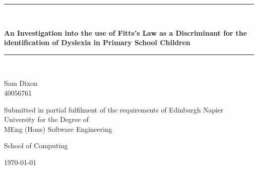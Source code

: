 \newcommand{\HRule}{\rule{\linewidth}{0.5mm}}

\begin{titlepage}
	\begin{center}

		\HRule \\[0.4cm]
	   	
	   	{\Large \bfseries An Investigation into the use of Fitts's Law as a Discriminant for the identification of Dyslexia in Primary School Children\par}
		\vspace{0.2cm}
		
		\HRule \\[1.5cm]
		
	   	\vspace{3cm}
		
		\begin{minipage}{0.4\textwidth}
			\begin{center}
				\large
				Sam Dixon 
				\\ 40056761		
		   	\end{center}
	    \end{minipage}
		
		\vspace{2cm}
		
	   	\begin{minipage}{1\textwidth}
	    	\begin{center} \large
				Submitted in partial fulfilment of the requirements of Edinburgh Napier University for the Degree of \\ MEng (Hons) Software Engineering
	    	\end{center}
	   	\end{minipage}
	
	   	\vfill
	
		\begin{minipage}{1\textwidth}
	    	\begin{center} \large
				School of Computing
	    	\end{center}
	   	\end{minipage}
		
		\vspace{1cm}
	    
	    {\large \today}

	\end{center}
\end{titlepage}